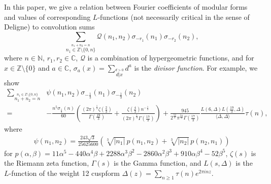 \documentclass[]{article}
\begin{document}
In this paper, we give a relation between  Fourier coefficients of modular forms and values of corresponding $L$-functions (not necessarily critical in the sense of Deligne) to convolution sums  
\begin{equation}\label{eq:convsum}
  \sum_{\stackrel{n_1+n_2 = n}{n_1 \in \mathbb{Z} \setminus \{ 0, n \} }}  \mathcal{Q}(n_1,n_2)  \sigma_{-r_1}(n_1) \sigma_{-r_2}(n_2),
  \end{equation}
  where $n\in\mathbb{N}$, $r_1,r_2\in\mathbb{C}$, $\mathcal{Q}$ is a combination of hypergeometric functions, and for  $x \in \mathbb{Z}\setminus \{0\}$ and $a \in \mathbb{C}$, $\displaystyle
    \sigma_{a}(x) = \sum_{\stackrel{d>0}{d | x }} d^a$ 
is the \textit{divisor function}. 
For example, we show \begin{equation}\label{eq:k=12,r1=1/3}
    \begin{split}
\sum_{ \stackrel{n_1 \in \mathbb{Z} \setminus \{ 0,n \}}{n_1+n_2=n}  } & \psi(n_1,n_2) \sigma_{-\frac{1}{3}}(n_1) \sigma_{-\frac{1}{3}}(n_2)  
\\ = &-  \frac{ n^5 \sigma_{\frac{1}{3}}(n) }{60} \left( \frac{(2 \pi)^{\frac{1}{3}} \zeta(\frac{2}{3})}{\Gamma( \frac{19}{3}) } + \frac{\zeta(\frac{4}{3}) n^{-\frac{1}{3}}  }{   (2\pi)^{\frac{1}{3}} \Gamma(\frac{17}{3}) }     \right)     
+   \frac{ 945 }{ 2^{\frac{52}{3}} \pi^{\frac{34}{3}} \Gamma(\frac{17}{3})   } \frac{L( 6,\Delta ) L( \frac{19}{3}, \Delta )}{\langle \Delta,  \Delta \rangle} \tau(n),     
    \end{split}
\end{equation}
where 
\begin{align}
\displaystyle\psi(n_1, n_2) =\frac{243 \sqrt{3}\,   }{25625600    } \left(\sqrt[3]{| n_1| }\, p(n_1,n_2)+\sqrt[3]{| n_2| } \,p(n_2,n_1)\right)
\end{align}
for $p(\alpha,\beta) =11 \alpha^5 -440\alpha^4 \beta  +2288 \alpha^3\beta^2  - 2860 \alpha^2 \beta^3 +910 \alpha\beta^4 -52 \beta^5$, $\zeta(s)$ is the Riemann zeta function, $\Gamma(s)$ is the Gamma function, and $L(s,\Delta)$ is the $L$-function of the weight 12 cuspform $\Delta(z) = \sum_{n\geq 1} \tau(n) e^{2\pi i n z}$.
\end{document}

